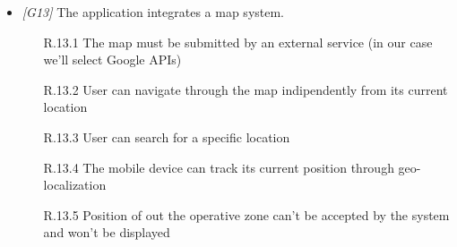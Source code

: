 \begin{itemize}
\item \textit{[G13]} The application integrates a map system.
                   
                  \begin{itemize}
                        \item [R.13.1] The map must be submitted by an external service (in our case we'll select Google APIs)
                        \item [R.13.2] User can navigate through the map indipendently from its current location
                        \item [R.13.3] User can search for a specific location
                        \item [R.13.4] The mobile device can track its current position through geo-localization
                        \item [R.13.5] Position of out the operative zone can't be accepted by the system and won't be displayed
                   \end{itemize}


            \end{itemize}
            
\vfill
